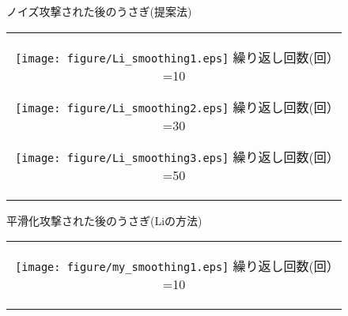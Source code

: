 \documentclass[11pt]{jreport}
\begin{document}
{\begin{figure}[htbp]
\begin{center}
\begin{tabular}{c}
    \end{tabular}
    \caption{ノイズ攻撃された後のうさぎ(提案法)}
    \label{fig:noise2}
  \end{center}
\end{figure}


\begin{figure}[htbp]
  \begin{center}
    \begin{tabular}{c}

      \begin{minipage}{0.33\hsize}
        \begin{center}
          \texttt{[image: figure/Li\_smoothing1.eps]}
          \hspace{1.6cm} 繰り返し回数(回）=10
        \end{center}
      \end{minipage}

      \begin{minipage}{0.33\hsize}
        \begin{center}
          \texttt{[image: figure/Li\_smoothing2.eps]}
          \hspace{1.6cm} 繰り返し回数(回）=30
        \end{center}
      \end{minipage}

      \begin{minipage}{0.33\hsize}
        \begin{center}
          \texttt{[image: figure/Li\_smoothing3.eps]}
          \hspace{1.6cm} 繰り返し回数(回）=50
        \end{center}
      \end{minipage}

    \end{tabular}
    \caption{平滑化攻撃された後のうさぎ(Liの方法)}
    \label{fig:smoothing1}
  \end{center}
\end{figure}

\begin{figure}[htbp]
  \begin{center}
    \begin{tabular}{c}

      \begin{minipage}{0.33\hsize}
        \begin{center}
          \texttt{[image: figure/my\_smoothing1.eps]}
          \hspace{1.6cm} 繰り返し回数(回）=10
        \end{center}
      \end{minipage}


\end{tabular}
\end{center}
\end{figure}}
\end{document}
